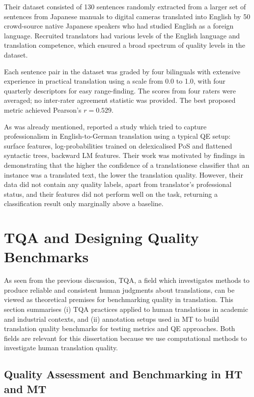 Their dataset consisted of 130 sentences randomly extracted from a larger set of sentences from Japanese manuals to digital cameras translated into English by 50 crowd-source native Japanese speakers who had studied English as a foreign language. Recruited translators had various levels of the English language and translation competence, which ensured a broad spectrum of quality levels in the dataset. 

Each sentence pair in the dataset was graded by four bilinguals with extensive experience in practical translation using a scale from 0.0 to 1.0, with four quarterly descriptors for easy range-finding. The scores from four raters were averaged; no inter-rater agreement statistic was provided. The best proposed metric achieved Pearson's $r=0.529$.

As was already mentioned, \citet{Rubino2016} reported a study which tried to capture professionalism in English-to-German translation using a typical QE setup: surface features, log-probabilities trained on delexicalised PoS and flattened syntactic trees, backward LM features. Their work was motivated by findings in~\citet{Aharoni2014} demonstrating that the higher the confidence of a translationese classifier that an instance was a translated text, the lower the translation quality. However, their data did not contain any quality labels, apart from translator's professional status, and their features did not perform well on the task, returning a classification result only marginally above a baseline.


\section{\label{sec:ass}TQA and Designing Quality Benchmarks}

As seen from the previous discussion, \gls{TQA}, a field which investigates methods to produce reliable and consistent human judgments about translations, can be viewed as theoretical premises for benchmarking quality in translation. 
This section summarises (i) TQA practices applied to human translations in academic and industrial contexts, and (ii) annotation setups used in MT to build translation quality benchmarks for testing metrics and QE approaches. Both fields are relevant for this dissertation because we use computational methods to investigate human translation quality. 

\subsection{\label{ssec:practices}Quality Assessment and Benchmarking in HT and MT}

